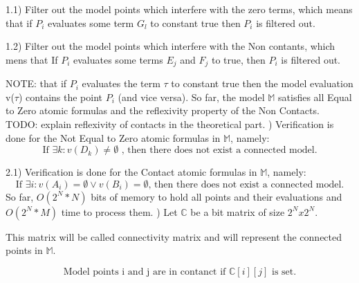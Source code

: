 \documentclass{article}
\begin{document}
			1.1) Filter out the model points which interfere with the zero terms, 
			which means that if $P_i$ evaluates some term $G_l$ to constant true then $P_i$ is filtered out.
			\newline

			1.2) Filter out the model points which interfere with the Non contants, which mens that 
				If $P_i$ evaluates some terms $E_j$ and $F_j$ to true, then $P_i$ is filtered out.
			\newline

			NOTE: that if $P_i$ evaluates the term $\tau$ to constant true then the model 
			evaluation v($\tau$) contains the point $P_i$ (and vice versa).
			\newline
			\newline
		So far, the model $\mathbb{M}$ satisfies all Equal to Zero atomic formulas and 
		the reflexivity property of the Non Contacts.
		\newline TODO: explain reflexivity of contacts in the theoretical part.
			\newline
			) Verification is done for the Not Equal to Zero atomic formulas in $\mathbb{M}$, namely:
			\begin{equation}
				\text{If  } \exists k: v(D_k) \neq \emptyset \text{ , then there does not exist a connected model.}
			\end{equation}

		2.1) Verification is done for the Contact atomic formulas in $\mathbb{M}$, namely:
			\begin{equation}
				\text{If  } \exists i: v(A_i) = \emptyset \vee v(B_i) = \emptyset \text{, then there does not exist a connected model.}
			\end{equation}
			\newline
		So far, $O(2^N * N)$ bits of memory to hold all points and 
		their evaluations and $O(2^N * M)$ time to process them.
			\newline
			) Let $\mathbb{C}$ be a bit matrix of size $2^N x 2^N$.
			\newline
			
			This matrix will be called connectivity matrix and will represent the connected points in $\mathbb{M}$.
			
			\begin{equation}
				\text{Model points i and j are in contanct if } \mathbb{C}[ i ][ j ] \text{ is set.}
			\end{equation}
\end{document}
